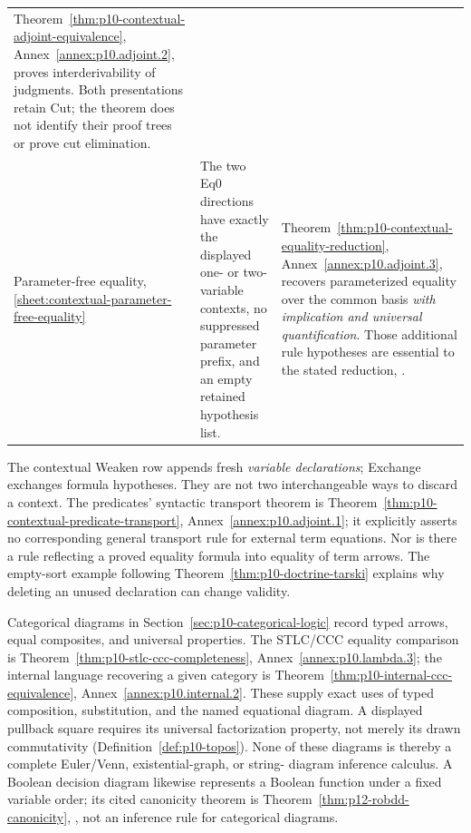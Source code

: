 \begin{longtable}{@{}p{.20\linewidth}p{.35\linewidth}p{.37\linewidth}@{}}
Theorem~\ref{thm:p10-contextual-adjoint-equivalence},
Annex~\ref{annex:p10.adjoint.2}, proves interderivability of judgments.
Both presentations retain Cut; the theorem does not identify their proof
trees or prove cut elimination. \\
\addlinespace
Parameter-free equality, \ref{sheet:contextual-parameter-free-equality} &
The two Eq0 directions have exactly the displayed one- or two-variable
contexts, no suppressed parameter prefix, and an empty retained hypothesis
list. & Theorem~\ref{thm:p10-contextual-equality-reduction},
Annex~\ref{annex:p10.adjoint.3}, recovers parameterized equality over the
common basis \emph{with implication and universal quantification}.
Those additional rule hypotheses are essential to the stated reduction,
\cite[Remark~5.6.2]{Pitts1995Draft}. \\
\bottomrule
\end{longtable}\endgroup

The contextual Weaken row appends fresh \emph{variable declarations};
Exchange exchanges formula hypotheses.  They are not two interchangeable
ways to discard a context.  The predicates' syntactic transport theorem is
Theorem~\ref{thm:p10-contextual-predicate-transport},
Annex~\ref{annex:p10.adjoint.1}; it explicitly asserts no corresponding
general transport rule for external term equations.  Nor is there a rule
reflecting a proved equality formula into equality of term arrows.  The
empty-sort example following Theorem~\ref{thm:p10-doctrine-tarski} explains
why deleting an unused declaration can change validity.

Categorical diagrams in Section~\ref{sec:p10-categorical-logic} record typed
arrows, equal composites, and universal properties.  The STLC/CCC equality
comparison is Theorem~\ref{thm:p10-stlc-ccc-completeness},
Annex~\ref{annex:p10.lambda.3}; the internal language recovering a given
category is Theorem~\ref{thm:p10-internal-ccc-equivalence},
Annex~\ref{annex:p10.internal.2}.  These supply exact uses of typed
composition, substitution, and the named equational diagram.  A displayed
pullback square requires its universal factorization property, not merely
its drawn commutativity (Definition~\ref{def:p10-topos}).  None of these
diagrams is thereby a complete Euler/Venn, existential-graph, or string-
diagram inference calculus.  A Boolean decision diagram likewise represents
a Boolean function under a fixed variable order; its cited canonicity theorem
is Theorem~\ref{thm:p12-robdd-canonicity}, \cite{Bryant1986}, not an inference
rule for categorical diagrams.

